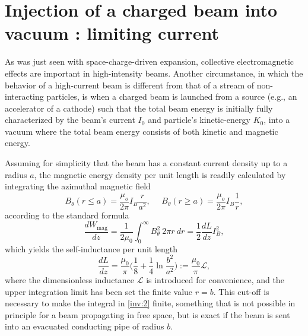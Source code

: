 \documentclass [12pt,a4paper,     ]{report} %
\newcommand{\DEF}{:=}                 %
\begin{document}
\section{Injection of a charged beam into vacuum : limiting current}
\label{inv:0}

As was just seen with space-charge-driven expansion, collective electromagnetic effects are important in high-intensity beams.  Another circumstance, in which the behavior of a high-current beam is different from that of a stream of non-interacting particles, is when a charged beam is launched from a source (e.g., an accelerator of a cathode) such that the total beam energy is initially fully characterized by the beam's current $I_0$ and  particle's kinetic-energy $K_0$, into a vacuum where the total beam energy consists of both kinetic and magnetic energy.

Assuming for simplicity that the beam has a constant current density up to a radius $a$, the magnetic energy density per unit length is readily calculated by integrating the azimuthal magnetic field
%
\begin{equation}\label{inv:1} %
       B_\theta (r \leq a) = \frac{\mu_o}{2\pi} I_B \frac{r}{a^2}, ~~~  ~~~
       B_\theta (r \geq a) = \frac{\mu_o}{2\pi} I_B \frac{1}{r},
\end{equation}
%
according to the standard formula
%
\begin{equation}\label{inv:2} %
        \frac{d W_{\text{mag}}}{d z}
            = \frac{1}{2\mu_0} \int_0^\infty B_\theta^2 ~ 2\pi r ~ dr
            = \frac{1}{2} \frac{d L}{d z} I_B^2,
\end{equation}
%
which yields the self-inductance per unit length
%
\begin{equation}\label{inv:3} %
     \frac{d L}{d z} 
   = \frac{\mu_0}{\pi} \bigl(\frac{1}{8} + \frac{1}{4} \ln\frac{b^2}{a^2} \bigr)
   \DEF \frac{\mu_0}{\pi} \mathcal{L}, 
\end{equation}
%
where the dimensionless inductance $\mathcal{L}$ is introduced for convenience, and the upper integration limit has been set the finite value $r=b$.  This cut-off is necessary to make the integral in \eqref{inv:2} finite, something that is not possible in principle for a beam propagating in free space, but is exact if the beam is sent into an evacuated conducting pipe of radius $b$. 
\end{document}
